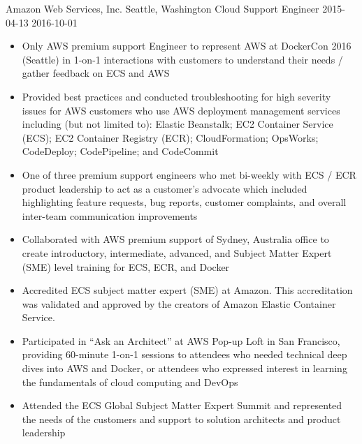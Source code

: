 \roleheader
    {Amazon Web Services, Inc.}
    {Seattle, Washington}
    {Cloud Support Engineer }
    {2015-04-13}
    {2016-10-01}
\begin{itemize}

    \item Only AWS premium support Engineer to represent AWS at DockerCon 2016 (Seattle) in 1-on-1 interactions with customers to understand their needs / gather feedback on ECS and AWS

    \item Provided best practices and conducted troubleshooting for high severity issues for AWS customers who use AWS deployment management services including (but not limited to): Elastic Beanstalk; EC2 Container Service (ECS); EC2 Container Registry (ECR); CloudFormation; OpsWorks; CodeDeploy; CodePipeline; and CodeCommit

    \item One of three premium support engineers who met bi-weekly with ECS / ECR product leadership to act as a customer's advocate which included highlighting feature requests, bug reports, customer complaints, and overall inter-team communication improvements

    \item Collaborated with AWS premium support of Sydney, Australia office to create introductory, intermediate, advanced, and Subject Matter Expert (SME) level training for ECS, ECR, and Docker

    \item Accredited ECS subject matter expert (SME) at Amazon. This accreditation was validated and approved by the creators of Amazon Elastic Container Service.

    \item Participated in ``Ask an Architect'' at AWS Pop-up Loft in San Francisco, providing 60-minute 1-on-1 sessions to attendees who needed technical deep dives into AWS and Docker, or attendees who expressed interest in learning the fundamentals of cloud computing and DevOps

    \item Attended the ECS Global Subject Matter Expert Summit and represented the needs of the customers and support to solution architects and product leadership

\end{itemize}
